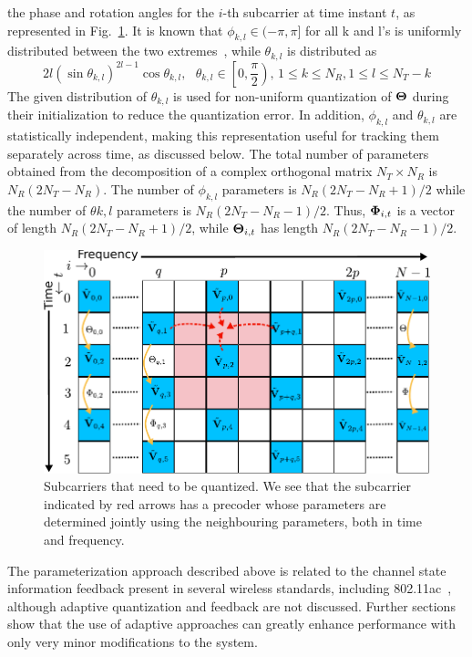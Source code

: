 \documentclass[journal,10pt,twocolumn]{IEEEtran}
\begin{document}
the phase and rotation angles for the $i$-th subcarrier at time
instant $t$, as represented in Fig.~\ref{fig:adpm-fig}. It is known
that $\phi_{k,l} \in (-\pi, \pi]$ for all k and l's is uniformly distributed 
between the two
extremes~\cite{4114278}, while $\theta_{k,l}$ is distributed
as~\cite{4114278}
\begin{equation}
2l(\sin\theta_{k,l})^{2l-1}\cos\theta_{k,l}, \mbox{  }\theta_{k,l} \in \left[0, \frac{\pi}{2}\right) \mbox{, }1\leq k \leq N_R, 1\leq l 
\leq N_T -k
\end{equation}
The given distribution of $\theta_{k,l}$ is used for non-uniform quantization
of $\bf{\Theta}$ during their initialization to reduce the quantization error.
In addition, $\phi_{k,l}$ and $\theta_{k,l}$ are statistically independent,
making this representation useful for tracking them separately across
time, as discussed below. The total number of
parameters obtained from the decomposition of a complex orthogonal
matrix $N_{T} \times N_{R} $ is $N_{R}(2N_{T} - N_{R})$. The number of
$\phi_{k,l}$ parameters is $N_{R}(2N_{T} - N_{R}+1)/2$ while the number of
$\theta{k,l}$ parameters is $N_{R}(2N_{T} - N_{R}-1)/2$. Thus, ${\bf{\Phi}}_{i,t}$
is a vector of length $N_{R}(2N_{T} - N_{R}+1)/2$, while
${\bf{\Theta}}_{i,t}$ has length $N_{R}(2N_{T} - N_{R}-1)/2$.~\cite{4114278}
\begin{figure}
\begin{center}
\includegraphics[width=0.7\columnwidth]{images/new-adpm.pdf}
\caption{\label{fig:adpm-fig}Subcarriers that need to be
  quantized. We see that the subcarrier indicated by
  red arrows has a precoder whose parameters are determined jointly
  using the neighbouring parameters, both in time and frequency.}
\end{center}
\end{figure}

The parameterization approach described above is related to the channel
state information feedback present in several wireless standards,
including 802.11ac~\cite{lou2013comparison}, although adaptive
quantization and feedback are not discussed. Further
sections show that the use of adaptive approaches can greatly enhance
performance with only very minor modifications to the system.
\end{document}
